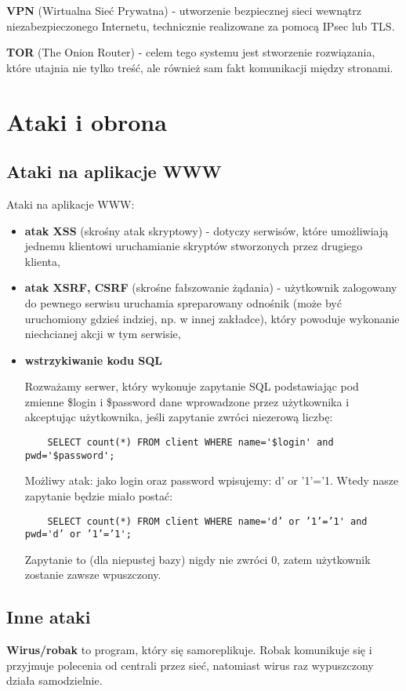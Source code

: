 \textbf{VPN} (Wirtualna Sieć Prywatna) - utworzenie bezpiecznej sieci wewnątrz niezabezpieczonego Internetu, technicznie realizowane za pomocą IPsec lub TLS.

\textbf{TOR} (The Onion Router) - celem tego systemu jest stworzenie rozwiązania, które utajnia nie tylko treść, ale również sam fakt komunikacji między stronami.

\section{Ataki i obrona}

\subsection{Ataki na aplikacje WWW}
Ataki na aplikacje WWW:
\begin{itemize}
    \item \textbf{atak XSS} (skrośny atak skryptowy) - dotyczy serwisów, które umożliwiają jednemu klientowi uruchamianie skryptów stworzonych przez drugiego klienta,
    \item \textbf{atak XSRF, CSRF} (skrośne fałszowanie żądania) - użytkownik zalogowany do pewnego serwisu uruchamia spreparowany odnośnik (może być uruchomiony gdzieś indziej, np. w innej zakładce), który powoduje wykonanie niechcianej akcji w tym serwisie,
    \item \textbf{wstrzykiwanie kodu SQL}
    \begin{example}
    Rozważamy serwer, który wykonuje zapytanie SQL podstawiając pod zmienne \$login i \$password dane wprowadzone przez użytkownika i akceptując użytkownika, jeśli zapytanie zwróci niezerową liczbę:
    \begin{verbatim}
    SELECT count(*) FROM client WHERE name='$login' and pwd='$password';
    \end{verbatim}
    Możliwy atak: jako login oraz password wpisujemy: d’ or ’1’=’1. Wtedy nasze zapytanie będzie miało postać:
    \begin{verbatim}
    SELECT count(*) FROM client WHERE name='d’ or ’1’=’1' and pwd='d’ or ’1’=’1';
    \end{verbatim}
    Zapytanie to (dla niepustej bazy) nigdy nie zwróci 0, zatem użytkownik zostanie zawsze wpuszczony.
    \end{example}
\end{itemize}

\subsection{Inne ataki}
\textbf{Wirus/robak} to program, który się samoreplikuje. Robak komunikuje się i przyjmuje polecenia od centrali przez sieć, natomiast wirus raz wypuszczony działa samodzielnie.

